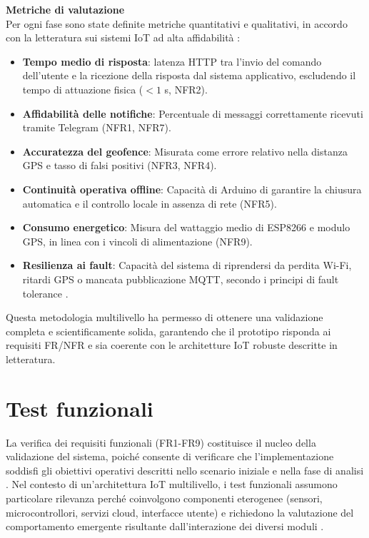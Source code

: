 \textbf{Metriche di valutazione} \\
Per ogni fase sono state definite metriche quantitativi e qualitativi, in accordo con la letteratura sui sistemi IoT ad alta affidabilità \cite{Zanella2014, Perera2015}:
\begin{itemize}
    \item \textbf{Tempo medio di risposta}: latenza HTTP tra l’invio del comando dell’utente e la ricezione della risposta dal sistema applicativo, escludendo il tempo di attuazione fisica ($< 1$ s, NFR2).
    \item \textbf{Affidabilità delle notifiche}: Percentuale di messaggi correttamente ricevuti tramite Telegram (NFR1, NFR7).
    \item \textbf{Accuratezza del geofence}: Misurata come errore relativo nella distanza GPS e tasso di falsi positivi (NFR3, NFR4).
    \item \textbf{Continuità operativa offline}: Capacità di Arduino di garantire la chiusura automatica e il controllo locale in assenza di rete (NFR5).
    \item \textbf{Consumo energetico}: Misura del wattaggio medio di ESP8266 e modulo GPS, in linea con i vincoli di alimentazione (NFR9).
    \item \textbf{Resilienza ai fault}: Capacità del sistema di riprendersi da perdita Wi-Fi, ritardi GPS o mancata pubblicazione MQTT, secondo i principi di fault tolerance \cite{Avizienis2004}.
\end{itemize}

Questa metodologia multilivello ha permesso di ottenere una validazione completa e scientificamente solida, garantendo che il prototipo risponda ai requisiti FR/NFR e sia coerente con le architetture IoT robuste descritte in letteratura.

\section{Test funzionali}
La verifica dei requisiti funzionali (FR1-FR9) costituisce il nucleo della validazione del sistema, poiché consente di verificare che l'implementazione soddisfi gli obiettivi operativi descritti nello scenario iniziale e nella fase di analisi \cite{Pressman2019}. Nel contesto di un'architettura IoT multilivello, i test funzionali assumono particolare rilevanza perché coinvolgono componenti eterogenee (sensori, microcontrollori, servizi cloud, interfacce utente) e richiedono la valutazione del comportamento emergente risultante dall'interazione dei diversi moduli \cite{Gubbi2013, Tang2022}.

